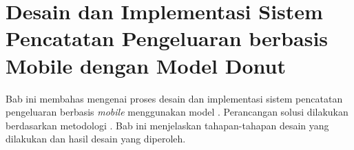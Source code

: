 \chapter{Desain dan Implementasi Sistem Pencatatan Pengeluaran berbasis Mobile dengan Model Donut}
\label{chapter:desain-implementasi}
Bab ini membahas mengenai proses desain dan implementasi sistem pencatatan pengeluaran berbasis \emph{mobile} menggunakan model \donut. Perancangan solusi dilakukan berdasarkan metodologi \dsrm. Bab ini menjelaskan tahapan-tahapan desain yang dilakukan dan hasil desain yang diperoleh.





